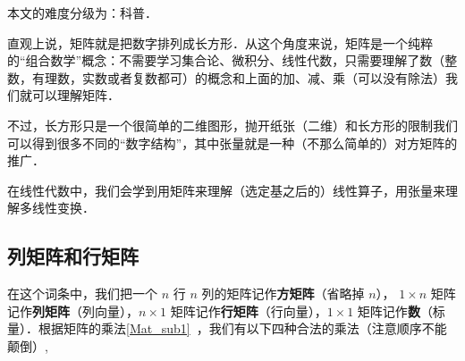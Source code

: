 

本文的难度分级为：科普．


直观上说，矩阵就是把数字排列成长方形．从这个角度来说，矩阵是一个纯粹的“组合数学”概念：不需要学习集合论、微积分、线性代数，只需要理解了数（整数，有理数，实数或者复数都可）的概念和上面的加、减、乘（可以没有除法）我们就可以理解矩阵．

不过，长方形只是一个很简单的二维图形，抛开纸张（二维）和长方形的限制我们可以得到很多不同的“数字结构”，其中张量就是一种（不那么简单的）对方矩阵的推广．

在线性代数中，我们会学到用矩阵来理解（选定基之后的）线性算子，用张量来理解多线性变换．

\subsection{列矩阵和行矩阵}
在这个词条中，我们把一个 $n$ 行 $n$ 列的矩阵记作\textbf{方矩阵}（省略掉 $n$）， $1 \times n$ 矩阵记作\textbf{列矩阵}（列向量），$n \times 1$ 矩阵记作\textbf{行矩阵}（行向量），$1 \times 1$ 矩阵记作\textbf{数}（标量）．根据矩阵的乘法\autoref{Mat_sub1}~，我们有以下四种合法的乘法（注意顺序不能颠倒）,

